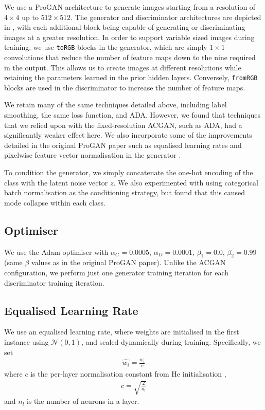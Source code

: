 We use a ProGAN architecture to generate images starting from a resolution of $4\times 4$ up to $512\times 512$.
The generator and discriminator architectures are depicted in , with each additional block being capable of generating or discriminating images at a greater resolution.
In order to support variable sized images during training, we use \lstinline{toRGB} blocks in the generator, which are simply $1\times 1$ convolutions that reduce the number of feature maps down to the nine required in the output.
This allows us to create images at different resolutions while retaining the parameters learned in the prior hidden layers.
Conversely, \lstinline{fromRGB} blocks are used in the discriminator to increase the number of feature maps. 

We retain many of the same techniques detailed above, including label smoothing, the same loss function, and ADA.
However, we found that techniques that we relied upon with the fixed-resolution ACGAN, such as ADA, had a significantly weaker effect here.
We also incorporate some of the improvements detailed in the original ProGAN paper such as equalised learning rates and pixelwise feature vector normalisation in the generator \cite{DBLP:journals/corr/abs-1710-10196}.

To condition the generator, we simply concatenate the one-hot encoding of the class with the latent noise vector $z$.
We also experimented with using categorical batch normalisation as the conditioning strategy, but found that this caused mode collapse within each class.

\subsection{Optimiser}

We use the Adam optimiser with $\alpha_G = 0.0005$, $\alpha_D= 0.0001$, $\beta_1 = 0.0$, $\beta_2 = 0.99$ (same $\beta$ values as in the original ProGAN paper).
Unlike the ACGAN configuration, we perform just one generator training iteration for each discriminator training iteration.

\subsection{Equalised Learning Rate}

We use an equalised learning rate, where weights are initialised in the first instance using $\mathcal{N}(0, 1)$, and scaled dynamically during training.
Specifically, we set
\begin{align}
    \hat{w_i} = \frac{w_i}{c}
\end{align}
where $c$ is the per-layer normalisation constant from He initialisation \cite{he2015delving},
\begin{align}
    c = \sqrt{\frac{2}{n_l}}
\end{align}
and $n_l$ is the number of neurons in a layer.

